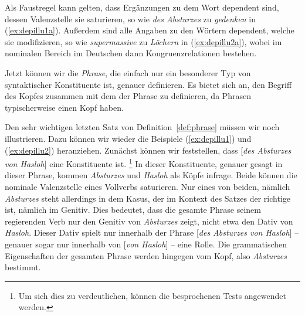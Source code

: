 
Als Faustregel kann gelten, dass Ergänzungen zu dem Wort dependent sind, dessen Valenzstelle sie saturieren, so wie \textit{des Absturzes} zu \textit{gedenken} in (\ref{ex:depillu1a}).
Außerdem sind alle Angaben zu den Wörtern dependent, welche sie modifizieren, so wie \textit{supermassive} zu \textit{Löchern} in (\ref{ex:depillu2a}), wobei im nominalen Bereich im Deutschen dann Kongruenzrelationen bestehen.

Jetzt können wir die \textit{Phrase}, die einfach nur ein besonderer Typ von syntaktischer Konstituente ist, genauer definieren.
Es bietet sich an, den Begriff des Kopfes zusammen mit dem der Phrase zu definieren, da Phrasen typischerweise einen Kopf haben.


Den sehr wichtigen letzten Satz von Definition~\ref{def:phrase} müssen wir noch illustrieren.
Dazu können wir wieder die Beispiele (\ref{ex:depillu1}) und (\ref{ex:depillu2}) heranziehen.
Zunächst können wir feststellen, dass [\textit{des Absturzes von Hasloh}] eine Konstituente ist.%
\footnote{Um sich dies zu verdeutlichen, können die besprochenen Tests angewendet werden.}
In dieser Konstituente, genauer gesagt in dieser Phrase, kommen \textit{Absturzes} und \textit{Hasloh} als Köpfe infrage.
Beide können die nominale Valenzstelle eines Vollverbs saturieren.
Nur eines von beiden, nämlich \textit{Absturzes} steht allerdings in dem Kasus, der im Kontext des Satzes der richtige ist, nämlich im Genitiv.
Dies bedeutet, dass die gesamte Phrase seinem regierenden Verb nur den Genitiv von \textit{Absturzes} zeigt, nicht etwa den Dativ von \textit{Hasloh}.
Dieser Dativ spielt nur innerhalb der Phrase [\textit{des Absturzes von Hasloh}] -- genauer sogar nur innerhalb von [\textit{von Hasloh}] -- eine Rolle.
Die grammatischen Eigenschaften der gesamten Phrase werden hingegen vom Kopf, also \textit{Absturzes} bestimmt.

